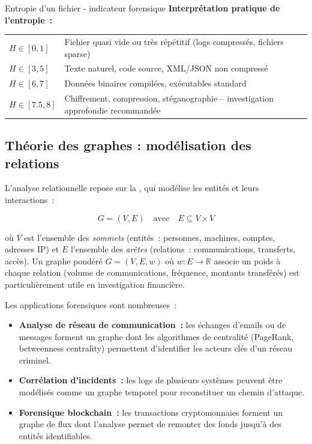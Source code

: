 \begin{boxartefact}{Entropie d'un fichier - indicateur forensique}
\textbf{Interprétation pratique de l'entropie~:}\\[0.5ex]
\begin{tabular}{p{3cm}p{7.5cm}}
$H \in [0, 1]$ & Fichier quasi vide ou très répétitif (logs compressés, fichiers
    sparse) \\
$H \in [3, 5]$ & Texte naturel, code source, XML/JSON non compressé \\
$H \in [6, 7]$ & Données binaires compilées, exécutables standard \\
$H \in [7.5, 8]$ & Chiffrement, compression, stéganographie -- investigation
    approfondie recommandée \\
\end{tabular}
\end{boxartefact}

\subsection{Théorie des graphes : modélisation des relations}

L'analyse relationnelle repose sur la ,
qui modélise les entités et leurs interactions~:

\begin{equation}
G = (V, E) \quad \text{avec} \quad E \subseteq V \times V
\label{eq:graphe}
\end{equation}

où $V$ est l'ensemble des \textit{sommets} (entités~: personnes, machines,
comptes, adresses IP) et $E$ l'ensemble des \textit{arêtes} (relations~:
communications, transferts, accès). Un graphe pondéré $G = (V, E, w)$ où
$w : E \to \mathbb{R}$ associe un poids à chaque relation (volume de
communications, fréquence, montants transférés) est particulièrement
utile en investigation financière.

\medskip

Les applications forensiques sont nombreuses~:

\begin{itemize}
    \item \textbf{Analyse de réseau de communication~:} les échanges d'emails
          ou de messages forment un graphe dont les algorithmes de centralité
          (PageRank, betweenness centrality) permettent d'identifier les
          acteurs clés d'un réseau criminel.
    \item \textbf{Corrélation d'incidents~:} les logs de plusieurs systèmes
          peuvent être modélisés comme un graphe temporel pour reconstituer
          un chemin d'attaque.
    \item \textbf{Forensique blockchain~:} les transactions
          cryptomonnaies forment un graphe de flux dont l'analyse permet
          de remonter des fonds jusqu'à des entités identifiables.
\end{itemize}

